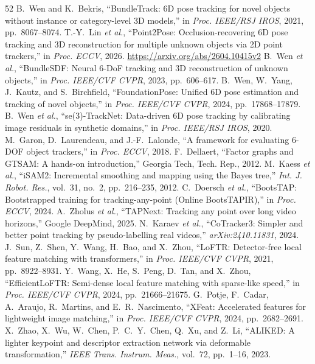 \documentclass{evidencescene}
\begin{document}
\begin{thebibliography}{52}
 B.~Wen and K.~Bekris, ``BundleTrack: 6D pose tracking for novel objects without instance or category-level 3D models,'' in \emph{Proc. IEEE/RSJ IROS}, 2021, pp.~8067--8074.
 T.-Y.~Lin \emph{et al.}, ``Point2Pose: Occlusion-recovering 6D pose tracking and 3D reconstruction for multiple unknown objects via 2D point trackers,'' in \emph{Proc. ECCV}, 2026. \url{https://arxiv.org/abs/2604.10415v2}
 B.~Wen \emph{et al.}, ``BundleSDF: Neural 6-DoF tracking and 3D reconstruction of unknown objects,'' in \emph{Proc. IEEE/CVF CVPR}, 2023, pp.~606--617.
 B.~Wen, W.~Yang, J.~Kautz, and S.~Birchfield, ``FoundationPose: Unified 6D pose estimation and tracking of novel objects,'' in \emph{Proc. IEEE/CVF CVPR}, 2024, pp.~17868--17879.
 B.~Wen \emph{et al.}, ``se(3)-TrackNet: Data-driven 6D pose tracking by calibrating image residuals in synthetic domains,'' in \emph{Proc. IEEE/RSJ IROS}, 2020.
 M.~Garon, D.~Laurendeau, and J.-F.~Lalonde, ``A framework for evaluating 6-DOF object trackers,'' in \emph{Proc. ECCV}, 2018.
 F.~Dellaert, ``Factor graphs and GTSAM: A hands-on introduction,'' Georgia Tech, Tech. Rep., 2012.
 M.~Kaess \emph{et al.}, ``iSAM2: Incremental smoothing and mapping using the Bayes tree,'' \emph{Int. J. Robot. Res.}, vol.~31, no.~2, pp.~216--235, 2012.
 C.~Doersch \emph{et al.}, ``BootsTAP: Bootstrapped training for tracking-any-point (Online BootsTAPIR),'' in \emph{Proc. ECCV}, 2024.
 A.~Zholus \emph{et al.}, ``TAPNext: Tracking any point over long video horizons,'' Google DeepMind, 2025.
 N.~Karaev \emph{et al.}, ``CoTracker3: Simpler and better point tracking by pseudo-labelling real videos,'' \emph{arXiv:2410.11831}, 2024.
 J.~Sun, Z.~Shen, Y.~Wang, H.~Bao, and X.~Zhou, ``LoFTR: Detector-free local feature matching with transformers,'' in \emph{Proc. IEEE/CVF CVPR}, 2021, pp.~8922--8931.
 Y.~Wang, X.~He, S.~Peng, D.~Tan, and X.~Zhou, ``EfficientLoFTR: Semi-dense local feature matching with sparse-like speed,'' in \emph{Proc. IEEE/CVF CVPR}, 2024, pp.~21666--21675.
 G.~Potje, F.~Cadar, A.~Araujo, R.~Martins, and E.~R.~Nascimento, ``XFeat: Accelerated features for lightweight image matching,'' in \emph{Proc. IEEE/CVF CVPR}, 2024, pp.~2682--2691.
 X.~Zhao, X.~Wu, W.~Chen, P.~C.~Y.~Chen, Q.~Xu, and Z.~Li, ``ALIKED: A lighter keypoint and descriptor extraction network via deformable transformation,'' \emph{IEEE Trans. Instrum. Meas.}, vol.~72, pp.~1--16, 2023.

\end{thebibliography}
\end{document}
